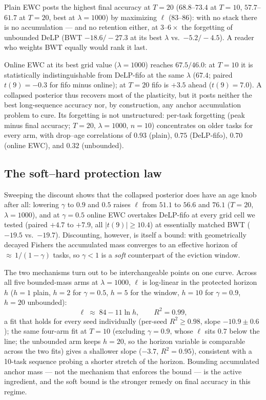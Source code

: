\documentclass[review,11pt,number]{elsarticle}
\newcommand{\delp}{DeLP}
\begin{document}
Plain EWC posts the highest final accuracy
at $T{=}20$ ($68.8$--$73.4$ at $T{=}10$, $57.7$--$61.7$ at $T{=}20$,
best at $\lambda{=}1000$) by maximizing $\ell$ ($83$--$86$): with no
stack there is no accumulation --- and no retention either, at
$3$--$6\times$ the forgetting of unbounded \delp{} (BWT
$-18.6/-27.3$ at its best $\lambda$ vs.\ $-5.2/-4.5$). A reader who
weights BWT equally would rank it last.

Online EWC at its best grid value ($\lambda{=}1000$) reaches $67.5/46.0$:
at $T{=}10$ it is statistically indistinguishable from \delp{}-fifo at
the same $\lambda$ ($67.4$; paired $t(9){=}-0.3$ for fifo minus online);
at $T{=}20$ fifo is
$+3.5$ ahead ($t(9){=}7.0$). A collapsed posterior thus recovers most of
the plasticity, but it posts neither the best long-sequence accuracy
nor, by construction, any anchor accumulation problem to cure. Its
forgetting is not unstructured: per-task forgetting (peak minus final
accuracy; $T{=}20$, $\lambda{=}1000$, $n{=}10$) concentrates on older
tasks for every arm, with drop--age correlations of $0.93$ (plain),
$0.75$ (\delp{}-fifo), $0.70$ (online EWC), and $0.32$ (unbounded).

\subsection{The soft--hard protection law}
\label{sec:exp-law}

Sweeping the discount shows that the collapsed posterior does have an
age knob after all: lowering $\gamma$ to $0.9$ and $0.5$
raises $\ell$ from $51.1$ to $56.6$ and $76.1$ ($T{=}20$,
$\lambda{=}1000$), and at $\gamma{=}0.5$ online EWC overtakes
\delp{}-fifo at every grid cell we tested (paired $+4.7$ to $+7.9$,
all $|t(9)|\geq10.4$) at essentially matched BWT ($-19.5$ vs.\
$-19.7$). Discounting, however, is itself a bound: with geometrically
decayed Fishers the accumulated mass converges to an effective horizon
of ${\approx}\,1/(1-\gamma)$ tasks, so $\gamma{<}1$ is a \emph{soft}
counterpart of the eviction window.

The two mechanisms turn out to be interchangeable points on one curve.
Across all five bounded-mass
arms at $\lambda{=}1000$, $\ell$ is log-linear in the protected
horizon $h$ ($h{=}1$ plain, $h{=}2$ for $\gamma{=}0.5$, $h{=}5$ for
the window, $h{=}10$ for $\gamma{=}0.9$, $h{=}20$ unbounded):
\begin{equation}
\label{eq:law}
\ell \;\approx\; 84 - 11\ln h, \qquad R^2 = 0.99,
\end{equation}
a fit that holds for
every seed individually (per-seed $R^2 \geq 0.98$, slope
$-10.9\pm0.6$); the same four-arm fit at $T{=}10$ (excluding
$\gamma{=}0.9$, whose $\ell$ sits $0.7$ below the line; the unbounded
arm keeps $h{=}20$, so the horizon variable is comparable across the two
fits) gives a shallower slope ($-3.7$, $R^2{=}0.95$), consistent with a
10-task sequence probing a shorter stretch of the horizon. Bounding accumulated
anchor mass --- not the mechanism that enforces the bound --- is the
active ingredient, and the soft bound is the stronger remedy on final
accuracy in this regime.
\end{document}
